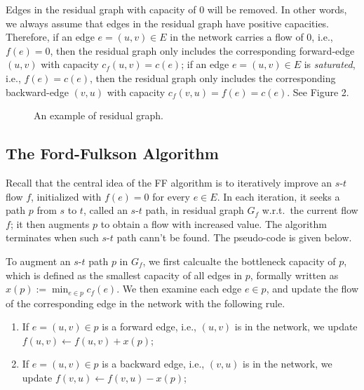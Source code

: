 Edges in the residual graph with capacity of 0 will be removed. In other words,
we always assume that edges in the residual graph have positive
capacities. Therefore, if an edge $e = (u,v) \in E$ in the network carries a
flow of 0, i.e., $f(e) = 0$, then the residual graph only includes the
corresponding forward-edge $(u, v)$ with capacity $c_f (u, v) = c(e)$; if an
edge $e = (u, v) \in E$  is \emph{saturated}, i.e., $f (e) = c(e)$, then the residual
graph only includes the corresponding backward-edge $(v, u)$ with capacity
$c_f (v, u) = f(e) = c(e)$. See Figure 2.

\begin{figure}[h]
\centering{}
\caption{An example of residual graph.}
\label{fig:example}
\end{figure}

\subsection*{The Ford-Fulkson Algorithm}

Recall that the central idea of the FF algorithm is to iteratively improve an
$s$-$t$ flow $f$, initialized with $f(e) = 0$ for every $e \in E$. In each iteration, it
seeks a path $p$ from $s$ to $t$, called an $s$-$t$ path, in residual graph $G_f$ w.r.t.\ the
current flow $f$; it then augments $p$ to obtain a flow with increased value. The
algorithm terminates when such $s$-$t$ path cann’t be found. The pseudo-code is
given below.

\begin{minipage}{0.8\textwidth}
	\xxx
	\xxx
	\xxx
	\xxx
	\xxx
	\xxx
	\xxx
	\xxx
	\xxx
\end{minipage}

To augment an $s$-$t$ path $p$ in $G_f$, we first calcualte the bottleneck capacity of
$p$, which is defined as the smallest capacity of all edges in $p$, formally
written as $x(p) := \min_{e\in p} c_f(e)$. We then examine each edge $e \in p$, and
update the flow of the corresponding edge in the network with the following rule.

\vspace*{-\topsep}
\begin{enumerate}
\item If $e = (u,v) \in p$ is a forward edge, i.e., $(u,v)$ is in the network, we update $f(u,v) \leftarrow f(u,v)+x(p)$;
\item If $e = (u,v) \in p$ is a backward edge, i.e., $(v,u)$ is in the network, we update $f(v,u) \leftarrow f(v,u)-x(p)$;
\end{enumerate}

